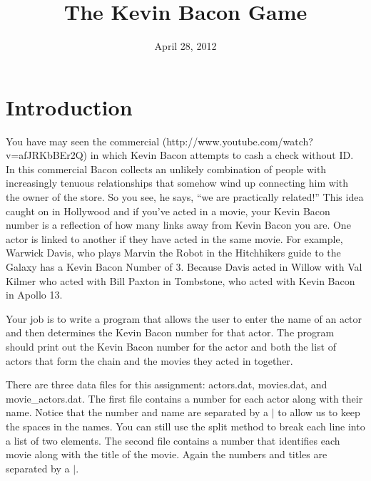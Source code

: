 \documentclass[11pt]{article}
\title{The Kevin Bacon Game}
\date{April 28, 2012}
\begin{document}
\maketitle 
\lstset{language=Python,numbers=left}

\section{Introduction}
You have may seen the commercial (http://www.youtube.com/watch?v=afJRKbBEr2Q) in which Kevin Bacon attempts to cash a check without ID.  In this commercial Bacon collects an unlikely combination of people with increasingly tenuous relationships that somehow wind up connecting him with the owner of the store.  So you see, he says, ``we are practically related!''  This idea caught on in Hollywood and if you've acted in a movie, your Kevin Bacon number is a reflection of how many links away from Kevin Bacon you are.  One actor is linked to another if they have acted in the same movie.  For example, Warwick Davis, who plays Marvin the Robot in the Hitchhikers guide to the Galaxy has a Kevin Bacon Number of 3.  Because Davis acted in Willow with Val Kilmer who acted with Bill Paxton in Tombstone, who acted with Kevin Bacon in Apollo 13.  

Your job is to write a program that allows the user to enter the name of an actor and then determines the Kevin Bacon number for that actor.  The program should print out the Kevin Bacon number for the actor and both the list of actors that form the chain and the movies they acted in together.

There are three data files for this assignment:  actors.dat, movies.dat, and movie\_actors.dat.  The first file contains a number for each actor along with their name. Notice that the number and name are separated by a $|$ to allow us to keep the spaces in the names.  You can still use the split method to break each line into a list of two elements. The second file contains a number that identifies each movie along with the title of the movie.  Again the numbers and titles are separated by a $|$.  
\vspace{.1in}
\end{document}
